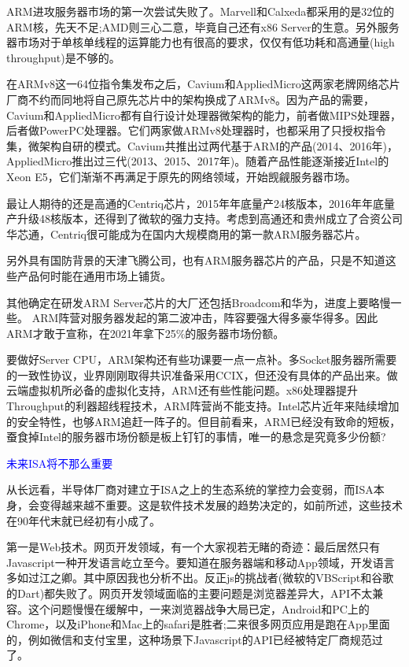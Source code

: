 \documentclass[utf8]{book}
\begin{document}
	ARM进攻服务器市场的第一次尝试失败了。Marvell和Calxeda都采用的是32位的ARM核，先天不足;AMD则三心二意，毕竟自己还有x86 Server的生意。另外服务器市场对于单核单线程的运算能力也有很高的要求，仅仅有低功耗和高通量(high throughput)是不够的。
	
	在ARMv8这一64位指令集发布之后，Cavium和AppliedMicro这两家老牌网络芯片厂商不约而同地将自己原先芯片中的架构换成了ARMv8。因为产品的需要，Cavium和AppliedMicro都有自行设计处理器微架构的能力，前者做MIPS处理器，后者做PowerPC处理器。它们两家做ARMv8处理器时，也都采用了只授权指令集，微架构自研的模式。Cavium共推出过两代基于ARM的产品(2014、2016年)，AppliedMicro推出过三代(2013、2015、2017年)。随着产品性能逐渐接近Intel的Xeon E5，它们渐渐不再满足于原先的网络领域，开始觊觎服务器市场。
	
	最让人期待的还是高通的Centriq芯片，2015年年底量产24核版本，2016年年底量产升级48核版本，还得到了微软的强力支持。考虑到高通还和贵州成立了合资公司华芯通，Centriq很可能成为在国内大规模商用的第一款ARM服务器芯片。
	
	另外具有国防背景的天津飞腾公司，也有ARM服务器芯片的产品，只是不知道这些产品何时能在通用市场上铺货。
	
	其他确定在研发ARM Server芯片的大厂还包括Broadcom和华为，进度上要略慢一些。
	ARM阵营对服务器发起的第二波冲击，阵容要强大得多豪华得多。因此ARM才敢于宣称，在2021年拿下25\%的服务器市场份额。
	
	要做好Server CPU，ARM架构还有些功课要一点一点补。多Socket服务器所需要的一致性协议，业界刚刚取得共识准备采用CCIX，但还没有具体的产品出来。做云端虚拟机所必备的虚拟化支持，ARM还有些性能问题。x86处理器提升Throughput的利器超线程技术，ARM阵营尚不能支持。Intel芯片近年来陆续增加的安全特性，也够ARM追赶一阵子的。但目前看来，ARM已经没有致命的短板，蚕食掉Intel的服务器市场份额是板上钉钉的事情，唯一的悬念是究竟多少份额?
	
	\begin{flushleft}
		{\large \textcolor{blue}{未来ISA将不那么重要}}
	\end{flushleft}
	
	从长远看，半导体厂商对建立于ISA之上的生态系统的掌控力会变弱，而ISA本身，会变得越来越不重要。这是软件技术发展的趋势决定的，如前所述，这些技术在90年代末就已经初有小成了。
	
	第一是Web技术。网页开发领域，有一个大家视若无睹的奇迹：最后居然只有Javascript一种开发语言屹立至今。要知道在服务器端和移动App领域，开发语言多如过江之卿。其中原因我也分析不出。反正js的挑战者(微软的VBScript和谷歌的Dart)都失败了。网页开发领域面临的主要问题是浏览器差异大，API不太兼容。这个问题慢慢在缓解中，一来浏览器战争大局已定，Android和PC上的Chrome，以及iPhone和Mac上的safari是胜者;二来很多网页应用是跑在App里面的，例如微信和支付宝里，这种场景下Javascript的API已经被特定厂商规范过了。
	
\end{document}
